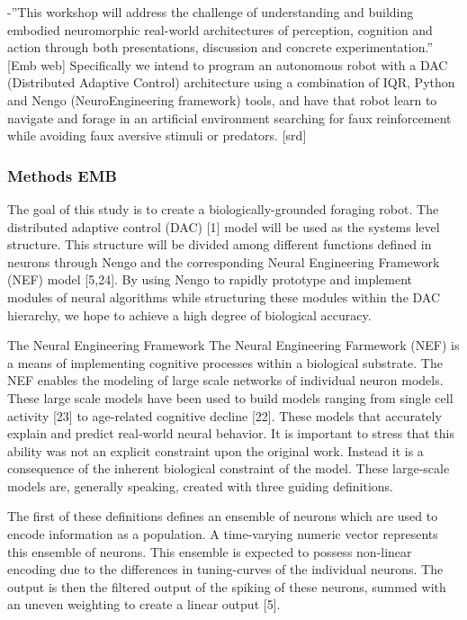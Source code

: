 -\textquotedblright{}This workshop will address the challenge of understanding
and building embodied neuromorphic real-world architectures of perception,
cognition and action through both presentations, discussion and concrete
experimentation.\textquotedblright{} {[}Emb web{]} Specifically we
intend to program an autonomous robot with a DAC (Distributed Adaptive
Control) architecture using a combination of IQR, Python and Nengo
(NeuroEngineering framework) tools, and have that robot learn to navigate
and forage in an artificial environment searching for faux reinforcement
while avoiding faux aversive stimuli or predators. {[}srd{]}


\subsubsection{Methods EMB}

The goal of this study is to create a biologically-grounded foraging
robot. The distributed adaptive control (DAC) {[}1{]} model will be
used as the systems level structure. This structure will be divided
among different functions defined in neurons through Nengo and the
corresponding Neural Engineering Framework (NEF) model {[}5,24{]}.
By using Nengo to rapidly prototype and implement modules of neural
algorithms while structuring these modules within the DAC hierarchy,
we hope to achieve a high degree of biological accuracy.

The Neural Engineering Framework The Neural Engineering Farmework
(NEF) is a means of implementing cognitive processes within a biological
substrate. The NEF enables the modeling of large scale networks of
individual neuron models. These large scale models have been used
to build models ranging from single cell activity {[}23{]} to age-related
cognitive decline {[}22{]}. These models that accurately explain and
predict real-world neural behavior. It is important to stress that
this ability was not an explicit constraint upon the original work.
Instead it is a consequence of the inherent biological constraint
of the model. These large-scale models are, generally speaking, created
with three guiding definitions.

The first of these definitions defines an ensemble of neurons which
are used to encode information as a population. A time-varying numeric
vector represents this ensemble of neurons. This ensemble is expected
to possess non-linear encoding due to the differences in tuning-curves
of the individual neurons. The output is then the filtered output
of the spiking of these neurons, summed with an uneven weighting to
create a linear output {[}5{]}.

